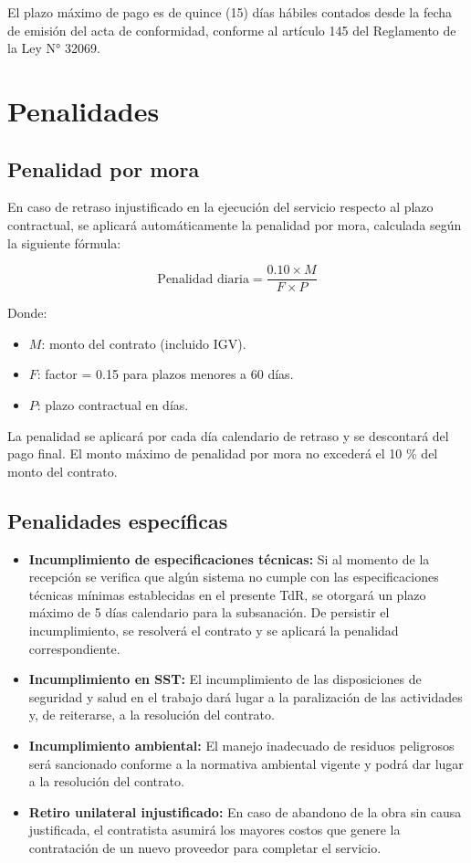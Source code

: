 \documentclass[12pt,a4paper]{article}
\begin{document}
El plazo máximo de pago es de quince (15) días hábiles contados desde la fecha de emisión del acta de conformidad, conforme al artículo 145 del Reglamento de la Ley N° 32069.

\section{Penalidades}

\subsection{Penalidad por mora}

En caso de retraso injustificado en la ejecución del servicio respecto al plazo contractual, se aplicará automáticamente la penalidad por mora, calculada según la siguiente fórmula:

\[
\text{Penalidad diaria} = \frac{0.10 \times M}{F \times P}
\]

Donde:
\begin{itemize}
  \item $M$: monto del contrato (incluido IGV).
  \item $F$: factor = 0.15 para plazos menores a 60 días.
  \item $P$: plazo contractual en días.
\end{itemize}

La penalidad se aplicará por cada día calendario de retraso y se descontará del pago final. El monto máximo de penalidad por mora no excederá el 10 \% del monto del contrato.

\subsection{Penalidades específicas}

\begin{itemize}
  \item \textbf{Incumplimiento de especificaciones técnicas:} Si al momento de la recepción se verifica que algún sistema no cumple con las especificaciones técnicas mínimas establecidas en el presente TdR, se otorgará un plazo máximo de 5 días calendario para la subsanación. De persistir el incumplimiento, se resolverá el contrato y se aplicará la penalidad correspondiente.
  \item \textbf{Incumplimiento en SST:} El incumplimiento de las disposiciones de seguridad y salud en el trabajo dará lugar a la paralización de las actividades y, de reiterarse, a la resolución del contrato.
  \item \textbf{Incumplimiento ambiental:} El manejo inadecuado de residuos peligrosos será sancionado conforme a la normativa ambiental vigente y podrá dar lugar a la resolución del contrato.
  \item \textbf{Retiro unilateral injustificado:} En caso de abandono de la obra sin causa justificada, el contratista asumirá los mayores costos que genere la contratación de un nuevo proveedor para completar el servicio.
\end{itemize}
\end{document}

